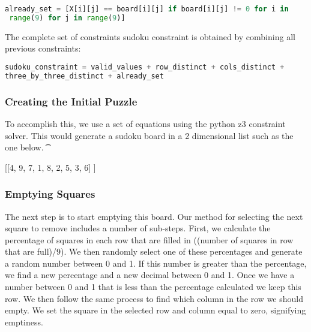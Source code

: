 \singlespace
\begin{lstlisting}[language=python, frame = single]
 already_set = [X[i][j] == board[i][j] if board[i][j] != 0 for i in
 range(9) for j in range(9)]

\end{lstlisting}
\doublespace

The complete set of constraints sudoku constraint is obtained by
combining all previous constraints:

\singlespace
\begin{lstlisting}[language=python, frame = single]
sudoku_constraint = valid_values + row_distinct + cols_distinct +
three_by_three_distinct + already_set
\end{lstlisting}
\doublespace


\subsubsection{Creating the Initial Puzzle}
To accomplish this, we use a set of equations using the python z3 constraint solver. This would generate a sudoku board in a 2 dimensional list such as the one
below. 
\t{
\singlespace
\begin{center}
[[4, 9, 7, 1, 8, 2, 5, 3, 6] \newline
[1, 5, 2, 3, 6, 4, 8, 9, 7] \newline
[8, 6, 3, 5, 7, 9, 4, 1, 2] \newline
[7, 3, 4, 6, 9, 1, 2, 5, 8] \newline
[2, 8, 9, 4, 3, 5, 7, 6, 1] \newline
[5, 1, 6, 7, 2, 8, 9, 4, 3] \newline
[3, 2, 5, 9, 1, 7, 6, 8, 4] \newline
[9, 7, 1, 8, 4, 6, 3, 2, 5] \newline
[6, 4, 8, 2, 5, 3, 1, 7, 9]] \newline
\end{center}}
\doublespace

\subsubsection{Emptying Squares}

The next step is to start emptying this board. Our method for
selecting the next square to remove includes a number of
sub-steps. First, we calculate the percentage of squares in each row that are filled in ((number of squares in row that are full)/9). We then randomly
select one of these percentages and generate a random number between 0
and 1. If this number is greater than the percentage, we find a new
percentage and a new decimal between 0 and 1. Once we have a number
between 0 and 1 that is less than the percentage calculated we keep
this row. We then follow the same process to find which column in the
row we should empty. We set the square in the selected row and column
equal to zero, signifying emptiness.


